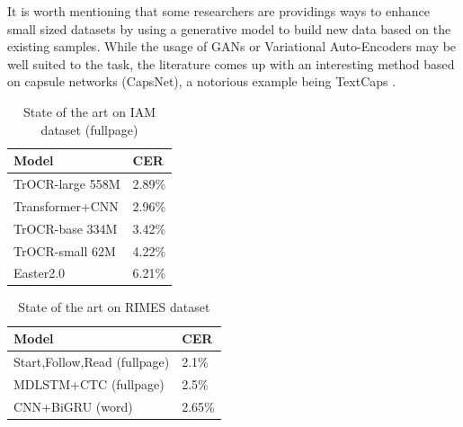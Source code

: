 It is worth mentioning that some researchers are providings ways to enhance small sized datasets by using a generative model to build new data based on the existing samples. While the usage of GANs \cite{ganText} or Variational Auto-Encoders \cite{vaeText} may be well suited to the task, the literature comes up with an interesting method based on capsule networks (CapsNet), a notorious example being TextCaps \cite{textcaps}.

\begin{table}[htbp]
\begin{center}
\begin{tabular}
{|p{170pt}|p{100pt}|}
\hline
 Model  &  CER\cite{cer} \\
\hline 
TrOCR-large 558M \cite{trocr} & 2.89\% \\ \hline
Transformer+CNN \cite{trcnn} & 2.96\% \\ \hline
TrOCR-base 334M \cite{trocr} & 3.42\% \\ \hline
TrOCR-small 62M \cite{trocr} & 4.22\% \\ \hline
Easter2.0 \cite{easter20} & 6.21\% \\ \hline
\end{tabular}
\end{center}
\captionsetup{justification=centering,margin=1cm}
\caption{State of the art on IAM dataset (fullpage)}
\label{sota_IAM}
\end{table}

\begin{table}[htbp]
\begin{center}
\begin{tabular}
{|p{220pt}|p{90pt}|}
\hline
 Model  &  CER\cite{cer} \\
\hline 
Start,Follow,Read (fullpage)\cite{sfr} & 2.1\% \\ \hline
MDLSTM+CTC (fullpage)\cite{mdlstm_rimes} & 2.5\% \\ \hline
CNN+BiGRU (word)\cite{mdlstm_rimes} & 2.65\% \\ \hline

\end{tabular}
\end{center}
\captionsetup{justification=centering,margin=1cm}
\caption{State of the art on RIMES dataset}
\label{sota_RIMES}
\end{table}


